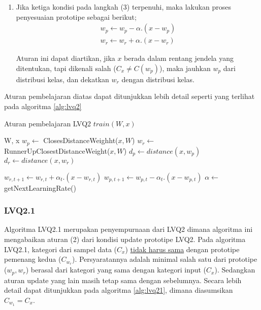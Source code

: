 \begin{enumerate}
  \item Jika ketiga kondisi pada langkah (3) terpenuhi, maka lakukan proses
  penyesuaian prototipe sebagai berikut;
  \begin{align}
  w_p \leftarrow w_p - \alpha . (x - w_p) \nonumber \\
  w_r \leftarrow w_r + \alpha . (x - w_r)
  \end{align}
  
  Aturan ini dapat diartikan, jika $x$ berada dalam rentang jendela yang
  ditentukan, tapi dikenali salah ($C_x \neq C(w_p)$), maka jauhkan $w_p$ dari
  distribusi kelas, dan dekatkan $w_r$ dengan distribusi kelas.
\end{enumerate}

\noindent 
Aturan pembelajaran diatas dapat ditunjukkan lebih detail seperti
yang terlihat pada algoritma \ref{alg:lvq2}

\begin{algorithm}  
\caption{Aturan pembelajaran LVQ2 $train(W, x)$}          
\label{alg:lvq2}                           
\begin{algorithmic}                    %
	\REQUIRE W, x
	\STATE $w_p \leftarrow $ ClosesDistanceWeighht($x, W$)
	\STATE $w_r \leftarrow $ RunnerUpClosestDistanceWeight($x, W$)
	\STATE $d_p \leftarrow distance(x, w_p)$
	\STATE $d_r \leftarrow distance(x, w_r)$
	
				\STATE $w_{r,t+1} \leftarrow w_{r,t} + \alpha_t . (x - w_{r,t})$
				\STATE $w_{p,t+1} \leftarrow w_{p,t} - \alpha_t . (x - w_{p,t})$
			\ENDIF
		\ENDIF
	\ENDIF
	\STATE $\alpha \leftarrow $ getNextLearningRate()
\end{algorithmic}
\end{algorithm}

\subsubsection{LVQ2.1}
Algoritma LVQ2.1 merupakan penyempurnaan dari LVQ2 dimana algoritma ini
mengabaikan aturan (2) dari kondisi update prototipe LVQ2. Pada algoritma
LVQ2.1, kategori dari sampel data ($C_x$) \underline{tidak harus sama} dengan
prototipe pemenang kedua ($C_{w_r}$). Persyaratannya adalah minimal salah
satu dari prototipe ($w_p, w_r$) berasal dari kategori yang sama dengan kategori
input ($C_x$). Sedangkan aturan update yang lain masih tetap sama dengan
sebelumnya. Secara lebih detail dapat ditunjukkan pada algoritma
\ref{alg:lvq21}, dimana diasumsikan $C_{w_1} = C_x$.

